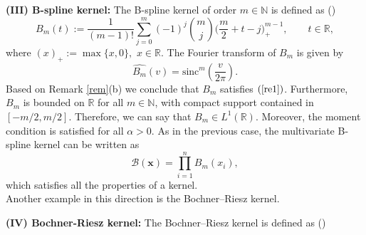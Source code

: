 \documentclass[11pt, a4paper]{article}
\theoremstyle{definition}
\numberwithin{equation}{section}
\def\NN{\mathbb N}
\def\RR{\mathbb R}
\def\sinc{\text{sinc}}
\begin{document}
\textbf{(III) B-spline kernel: }
The B-spline kernel of order $m \in\NN$ is defined as (\cite{bardaro10,multi})
$${B}_{m}(t):= \frac{1}{(m-1)!} \sum_{j=0}^{m} (-1)^{j} {m \choose j} \bigg( \frac{m}{2}+ t-j \bigg)_{+}^{m-1},\qquad t\in \mathbb{R},$$ where $(x)_{+} := \max \{x,0\},$ $ x \in \mathbb{R}.$ 
The Fourier transform of $B_m$ is given by
\begin{equation*} \label{e4}
	\widehat{B_{m}} (v)=
	\sinc^m\left(\frac{v}{2\pi}\right).
\end{equation*}
Based on Remark \ref{rem}(b) we conclude that $ {B}_{m}$ satisfies $(\ref{re1})$. Furthermore, ${B}_{m}$ is bounded on $\RR$ for all $m \in \NN $, with compact support contained in $[-m/2,m/2].$ Therefore, we can say that $B_m \in L^1(\RR)$.  Moreover, the moment condition is satisfied for all $\alpha>0$.
As in the previous case, the multivariate B-spline kernel can be written as
$$\displaystyle \mathcal{B}(\textbf{x})=\prod_{i=1}^{n}  B_m(x_i),$$ which satisfies all the properties of a kernel.\\ 

Another example in this direction is the  Bochner–Riesz kernel.

\textbf{(IV) Bochner-Riesz kernel:}
The Bochner–Riesz kernel is defined as (\cite{nessel})
\end{document}
